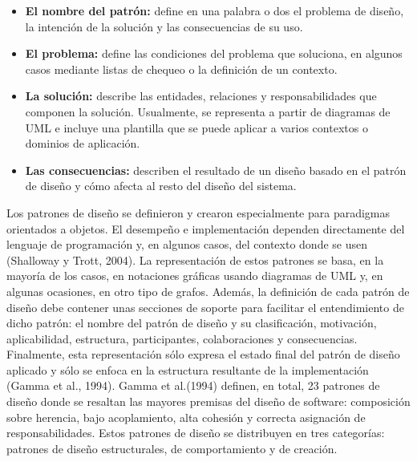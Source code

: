 \documentclass[twoside,twocolumn]{article}
\begin{document}
\begin{itemize}
\begin{itemize}
	\item \textbf{El nombre del patrón:} define en una palabra o dos el problema de diseño, la intención de la solución y las consecuencias de su uso.  
	\item \textbf{El problema:} define las condiciones del problema que soluciona, en algunos casos mediante listas de chequeo o la definición de un contexto.  
	\item \textbf{La solución:} describe las entidades, relaciones y responsabilidades que componen la solución. Usualmente, se representa a partir de diagramas de UML e incluye una plantilla que se puede aplicar a varios contextos o dominios de aplicación.  
	\item \textbf{Las consecuencias:} describen el resultado de un diseño basado en el patrón de diseño y cómo afecta al resto del diseño del sistema. 
\end{itemize}
Los patrones de diseño se definieron y crearon especialmente para paradigmas orientados a objetos. El desempeño e implementación dependen directamente del lenguaje de programación y, en algunos casos, del contexto donde se usen (Shalloway y Trott, 2004).  
La representación de estos patrones se basa, en la mayoría de los casos, en notaciones gráficas usando diagramas de UML y, en algunas ocasiones, en otro tipo de grafos. Además, la definición de cada patrón de diseño debe contener unas secciones de soporte para facilitar el entendimiento de dicho patrón: el nombre del patrón de diseño y su clasificación, motivación, aplicabilidad, estructura, participantes, colaboraciones y consecuencias. Finalmente, esta representación sólo expresa el estado final del patrón de diseño aplicado y sólo se enfoca en la estructura resultante de la implementación (Gamma et al., 1994).  
Gamma et al.(1994) definen, en total, 23 patrones de diseño donde se resaltan las mayores premisas del diseño de software: composición sobre herencia, bajo acoplamiento, alta cohesión y correcta asignación de responsabilidades. Estos patrones de diseño se distribuyen en tres categorías: patrones de diseño estructurales, de comportamiento y de creación. 


\end{itemize}
\end{document}
